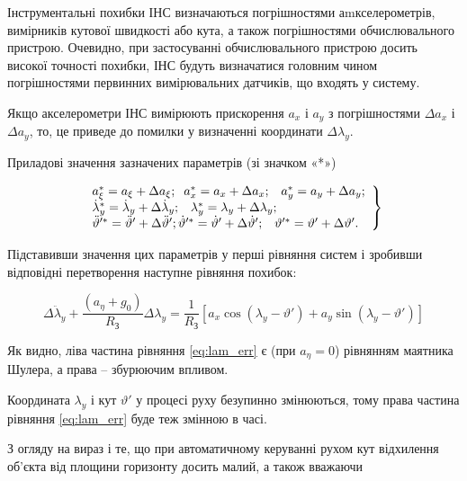Інструментальні похибки ІНС визначаються погрішностями аmкселерометрів, вимірників кутової швидкості або кута, 
а також погрішностями обчислювального пристрою. Очевидно, при застосуванні обчислювального пристрою досить високої 
точності похибки, ІНС будуть визначатися головним чином погрішностями первинних вимірювальних датчиків, що входять у систему.

Якщо акселерометри ІНС вимірюють прискорення $a_{x} $ і $a_{y} $ з погрішностями $\Delta a_{x} $ і $\Delta a_{y} $, то,  
це приведе до помилки у визначенні координати $\Delta \lambda _{y} $.

Приладові значення зазначених параметрів (зі значком «*»)

\begin{equation} 
\label{eq:err} 
\left. 
\begin{array}{l} 
{a_{\xi }^{*} =a_{\xi } +\Delta a_{\xi } ;{\rm \; \; }a_{x}^{*} =a_{x} +\Delta a_{x} ;{\rm \; \; \; }a_{y}^{*} =a_{y} +\Delta a_{y} ;} 
\\ {\dot{\lambda }_{y}^{*} =\dot{\lambda }_{y} +\Delta \dot{\lambda }_{y} ;{\rm \; \; \; }\lambda _{y}^{*} =\lambda _{y} 
+\Delta \lambda _{y} ;{\rm \; \; \; }}
\\ {\ddot{\vartheta }'^{*} =\ddot{\vartheta }'+\Delta \ddot{\vartheta }'; \dot{\vartheta }'^{*} =\dot{\vartheta }'+\Delta \dot{\vartheta }';
{\rm \; \; \; }\vartheta '^{*} =\vartheta '+\Delta \vartheta '.} \end{array}\right\} 
\end{equation} 

Підставивши значення цих параметрів у перші рівняння систем і зробивши відповідні перетворення наступне рівняння похибок:

\begin{equation} 
\label{eq:lam_err} 
\Delta \ddot{\lambda }_{y} +\frac{(a_{\eta } +g_{0} )}{R_{{\text{З}}} } 
\Delta \lambda _{y} =\frac{1}{R_{{\text{З}}} } \left[a_{x} \cos (\lambda _{y} -\vartheta ')+a_{y} \sin (\lambda _{y} -
\vartheta ')\right] 
\end{equation} 

Як видно, ліва частина рівняння \eqref{eq:lam_err} є (при $a_{\eta } =0$) рівнянням маятника Шулера, а права -- збурюючим впливом.

Координата $\lambda _{y} $ і кут $\vartheta '$ у процесі руху безупинно змінюються, тому права частина рівняння \eqref{eq:lam_err} 
буде теж змінною в часі.

З огляду на вираз і те, що при автоматичному керуванні рухом кут відхилення об'єкта від площини горизонту досить малий, а також вважаючи

